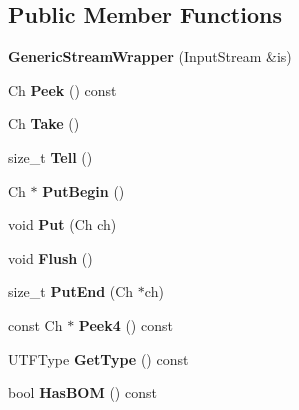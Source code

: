 \subsection*{Public Member Functions}
\begin{DoxyCompactItemize}
\item 
{\bfseries Generic\+Stream\+Wrapper} (Input\+Stream \&is)\hypertarget{classGenericStreamWrapper_a7b12b1de6337d3f8e635b650e372c803}{}\label{classGenericStreamWrapper_a7b12b1de6337d3f8e635b650e372c803}

\item 
Ch {\bfseries Peek} () const \hypertarget{classGenericStreamWrapper_a67b469da031928fb159d0c3b706f44d7}{}\label{classGenericStreamWrapper_a67b469da031928fb159d0c3b706f44d7}

\item 
Ch {\bfseries Take} ()\hypertarget{classGenericStreamWrapper_a1c0bc67a233e08ed89b4ff37455e7754}{}\label{classGenericStreamWrapper_a1c0bc67a233e08ed89b4ff37455e7754}

\item 
size\+\_\+t {\bfseries Tell} ()\hypertarget{classGenericStreamWrapper_a5068a627e0a2deffa985db39f89c5378}{}\label{classGenericStreamWrapper_a5068a627e0a2deffa985db39f89c5378}

\item 
Ch $\ast$ {\bfseries Put\+Begin} ()\hypertarget{classGenericStreamWrapper_a4b35b8e9b6feba4d7f1d99ffce17f83d}{}\label{classGenericStreamWrapper_a4b35b8e9b6feba4d7f1d99ffce17f83d}

\item 
void {\bfseries Put} (Ch ch)\hypertarget{classGenericStreamWrapper_a458b9f3e00ad41dadb069839ab53f0ba}{}\label{classGenericStreamWrapper_a458b9f3e00ad41dadb069839ab53f0ba}

\item 
void {\bfseries Flush} ()\hypertarget{classGenericStreamWrapper_a210c0864fbff3cc72f2f62ed461105fb}{}\label{classGenericStreamWrapper_a210c0864fbff3cc72f2f62ed461105fb}

\item 
size\+\_\+t {\bfseries Put\+End} (Ch $\ast$ch)\hypertarget{classGenericStreamWrapper_a84f8d6e1f95d53c4e8e22892d5113fd3}{}\label{classGenericStreamWrapper_a84f8d6e1f95d53c4e8e22892d5113fd3}

\item 
const Ch $\ast$ {\bfseries Peek4} () const \hypertarget{classGenericStreamWrapper_af3eb96763744e85075cc221b5840cda3}{}\label{classGenericStreamWrapper_af3eb96763744e85075cc221b5840cda3}

\item 
U\+T\+F\+Type {\bfseries Get\+Type} () const \hypertarget{classGenericStreamWrapper_aad72e81846f45d922f8f172b9842c7bb}{}\label{classGenericStreamWrapper_aad72e81846f45d922f8f172b9842c7bb}

\item 
bool {\bfseries Has\+B\+OM} () const \hypertarget{classGenericStreamWrapper_a6ebd59bda5fc5754d71731416a88906b}{}\label{classGenericStreamWrapper_a6ebd59bda5fc5754d71731416a88906b}

\end{DoxyCompactItemize}
